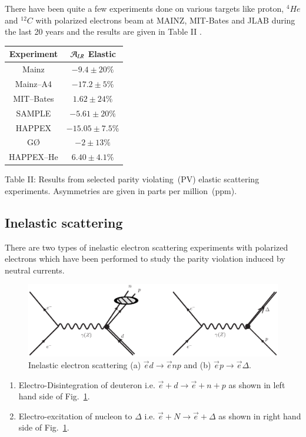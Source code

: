 There have been quite a few experiments done on various targets like proton, $^4{He}$ and $^{12}{C}$ with polarized electrons beam at MAINZ, MIT-Bates and JLAB during the last 20 years and the results are given in Table II \cite{key22}.
\begin{center}
\begin{tabular}{|c|c|}
 \hline
 Experiment  & ${\cal A}_{LR}$ Elastic\\ 
 \hline
 Mainz& $-9.4\pm20\%$ \\ 
 \hline
 Mainz--A4&$-17.2\pm 5\%$ \\
  \hline
 MIT--Bates& $1.62\pm 24\%$\\
  \hline
 SAMPLE& $-5.61\pm 20\%$ \\
  \hline
HAPPEX& $-15.05\pm 7.5\%$\\ 
\hline
G\O &$-2\pm13\%$ \\ 
\hline 
HAPPEX--He& $6.40\pm4.1\%$\\ 
\hline
\end{tabular}

\medskip

 {Table II: Results from selected parity violating~(PV) elastic scattering experiments. Asymmetries are given in parts per million~(ppm).}
\end{center}


\subsection{Inelastic scattering}\label{chap9-subsec3.2}

There are two types of inelastic electron scattering experiments with polarized electrons which have been performed to study the parity violation induced by neutral currents.
\begin{figure}[H]
\centering
\includegraphics[scale=0.35]{src/images/chap9/fig2.eps}
\caption{Inelastic electron scattering (a) $\vec{e}d\rightarrow\vec{e}np$ and (b) $\vec{e}p\rightarrow \vec{e}\Delta$.}\label{chap9-fig3}
\end{figure}
\begin{enumerate}
    \item Electro-Disintegration of deuteron i.e. $\vec{e}+d \rightarrow \vec{e}+n+p$ as shown in left hand side of Fig.~\ref{chap9-fig3}. 
    \item Electro-excitation of nucleon to $\Delta$ i.e. $\vec{e}+N \rightarrow \vec{e}+\Delta$ as shown in right hand side of Fig.~\ref{chap9-fig3}.  
\end{enumerate}   

